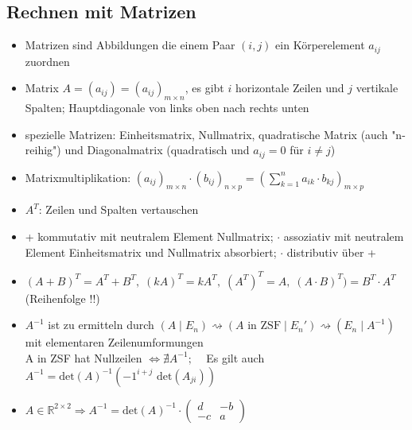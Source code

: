 \documentclass[10pt,a4paper]{article}
\begin{document}
\subsection{Rechnen mit Matrizen}
\begin{itemize}
\item Matrizen sind Abbildungen die einem Paar $(i,j)$ ein Körperelement $a_{ij}$ zuordnen 
\item Matrix $A=(a_{ij})=(a_{ij})_{m \times n}$, es gibt $i$ horizontale Zeilen und $j$ vertikale Spalten; Hauptdiagonale von links oben nach rechts unten
\item spezielle Matrizen: Einheitsmatrix, Nullmatrix, quadratische Matrix (auch "n-reihig") und Diagonalmatrix (quadratisch und $a_{ij}=0$ für $i\neq j$)
\item Matrixmultiplikation: $(a_{ij})_{m\times n} \cdot (b_{ij})_{n \times p}=(\sum_{k=1}^{n} a_{ik}\cdot b_{kj})_{m \times p}$ 
\item $A^{T}$: Zeilen und Spalten vertauschen
\item + kommutativ mit neutralem Element Nullmatrix; $\cdot$ assoziativ mit neutralem Element Einheitsmatrix und Nullmatrix absorbiert; $\cdot$ distributiv über + 
\item $(A+B)^{T}=A^{T}+B^{T},\; (kA)^{T}=kA^{T},\; (A^{T})^{T}=A,\; (A\cdot B)^{T})=B^{T}\cdot A^{T}$ (Reihenfolge !!)
\item $A^{-1}$ ist zu ermitteln durch $(A\mid E_{n})\rightsquigarrow (A \text{ in ZSF} \mid E_{n}') \rightsquigarrow (E_{n} \mid A^{-1})$ mit elementaren Zeilenumformungen\\ A in ZSF hat Nullzeilen $\Leftrightarrow \nexists A^{-1};\;\;\;$ Es gilt auch $A^{-1}=\text{det}(A)^{-1}(-1^{i+j}\text{ det}(A_{ji}))$
\item $A\in \mathbb{R}^{2\times 2} \Rightarrow A^{-1}=\text{det}(A)^{-1}\cdot \begin{pmatrix} d& -b\\ -c&a\end{pmatrix}$
\end{itemize}
\end{document}
